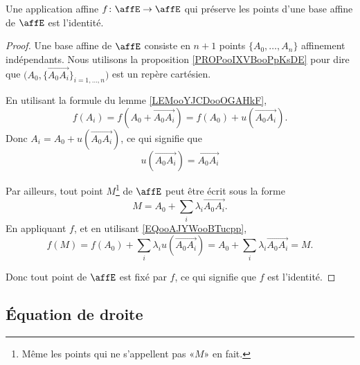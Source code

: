 \begin{lemma}       \label{LEMooDUMVooFtfFOe}
	Une application affine \( f\colon \affE\to \affE\) qui préserve les points d'une base affine de \( \affE\) est l'identité.
\end{lemma}

\begin{proof}
	Une base affine de \( \affE\) consiste en \( n+1\) points \( \{ A_0,\ldots, A_n \}\) affinement indépendants. Nous utilisons la proposition \ref{PROPooIXVBooPpKsDE} pour dire que \( \big( A_0, \{ \overrightarrow{A_0A_i} \}_{i=1,\ldots, n} \big)\) est un repère cartésien.

	En utilisant la formule du lemme \ref{LEMooYJCDooOGAHkF},
	\begin{equation}
		f(A_i)=f(A_0+\overrightarrow{A_0A_i})=f(A_0)+u(\overrightarrow{A_0A_i}).
	\end{equation}
	Donc \( A_i=A_0+u(\overrightarrow{A_0A_i})\), ce qui signifie que
	\begin{equation}        \label{EQooAJYWooBTucpp}
		u(\overrightarrow{A_0A_i})=\overrightarrow{A_0A_i}
	\end{equation}

	Par ailleurs, tout point \( M\)\footnote{Même les points qui ne s'appellent pas «\( M \)» en fait.} de \( \affE\) peut être écrit sous la forme
	\begin{equation}
		M=A_0+\sum_i\lambda_i\overrightarrow{A_0A_i}.
	\end{equation}
	En appliquant \( f\), et en utilisant \eqref{EQooAJYWooBTucpp},
	\begin{equation}
		f(M)=f(A_0)+\sum_i\lambda_iu(\overrightarrow{A_0A_i})=A_0+\sum_i\lambda_i\overrightarrow{A_0A_i}=M.
	\end{equation}

	Donc tout point de \( \affE\) est fixé par \( f\), ce qui signifie que \( f\) est l'identité.
\end{proof}

\subsection{Équation de droite}


